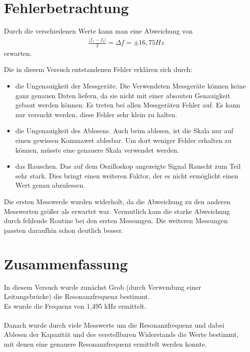 \documentclass[12pt,a4paper,]{scrreprt}
\begin{document}
	


	
\chapter{Fehlerbetrachtung}
	Durch die verschiedenen Werte kann man eine Abweichung von 
    \begin{align*}
    	\frac{|f_1 - f_2|}{2} = \Delta f =  \pm 16,75 Hz
    \end{align*}
    erwarten. 

    Die in diesem Versuch entstandenen Fehler erklären sich durch:
    \begin{itemize}
    \item die Ungenauigkeit der Messgeräte. Die Verwendeten Messgeräte können keine ganz genauen Daten liefern, da sie nicht mit einer absouten Genauigkeit gebaut werden können. Es treten bei allen Messgeräten Fehler auf. Es kann nur versucht werden, diese Fehler sehr klein zu halten.
    \item die Ungenauigkeit des Ablesens. Auch beim ablesen, ist die Skala nur auf einen gewissen Kommawet ablesbar. Um dort weniger Fehler erhalten zu können, müsste eine genauere Skala verwendet werden.
    \item das Rauschen. Das auf dem Oszilloskop angezeigte Signal Rauscht zum Teil sehr stark. Dies bringt einen weiteren Faktor, der es nicht ermöglicht einen Wert genau abzulessen.
    \end{itemize}
Die  ersten Messwerde wurden widerholt, da die Abweichung zu den anderen  Messwerten größer als erwartet war. Vermutlich kam die starke Abweichung durch fehlende Routine  bei den ersten Messungen. Die weiteren Messungen passten daraufhin schon deutlich besser.
	\pagebreak

	\chapter{Zusammenfassung}
    In diesem Versuch wurde zunächst Grob (durch Verwendung einer Leitungsbrücke) die Resonanzfrequenz bestimmt. \\
    Es wurde die Frequenz von 1,495 kHz ermittelt.\\
    \\
    Danach wurde durch viele Messwerte um die Resonanzfrequenz und dabei Ablesen der Kapazität und des verstellbaren Widerstands die Werte bestimmt, mit denen eine genauere Resonanzfrequenz ermittelt werden konnte.\\
    
\end{document}
